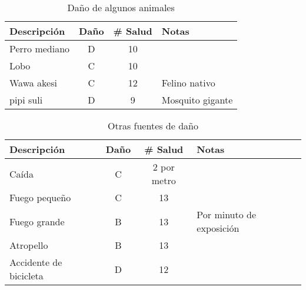 \begin{table}[ht]
\begin{tabular}{lccl}
\toprule
Descripción     & Daño & \# Salud & Notas         \\\midrule\midrule
Perro mediano   & D    & 10       &               \\\midrule
Lobo            & C    & 10       &               \\\midrule
Wawa akesi      & C    & 12       & Felino nativo \\\midrule 
pipi suli       & D    & 9        & Mosquito gigante \\\midrule
\end{tabular} 
\caption{Daño de algunos animales}
\end{table}



\begin{table}[ht]
\begin{tabular}{lccl}
\toprule
Descripción     & Daño & \# Salud       & Notas         \\\midrule\midrule
Caída           & C    & 2 por metro    &               \\\midrule
Fuego pequeño   & C    & 13             &               \\\midrule
Fuego grande    & B    & 13             & Por minuto de exposición \\\midrule
Atropello       & B    & 13             &               \\\midrule
Accidente de bicicleta & D  & 12        &               \\\midrule
\end{tabular} 
\caption{Otras fuentes de daño}
\end{table}





